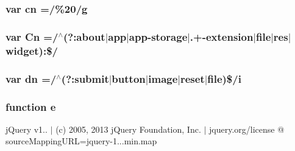 \subsubsection[{cn}]{\setlength{\rightskip}{0pt plus 5cm}var cn =/\%20/{\bf g}}\label{_bibabook_2_scripts_2jquery-1_810_82_8min_8js_a43c2bda2537661fb64e62fdfdcea1560}
\hypertarget{_bibabook_2_scripts_2jquery-1_810_82_8min_8js_ab832fcb3f80f807f0b65d1e3b4904de8}{}
\subsubsection[{Cn}]{\setlength{\rightskip}{0pt plus 5cm}var Cn =/$^\wedge$(?\+:about$\vert$app$\vert$app-\/storage$\vert$.+-\/extension$\vert$file$\vert$res$\vert$widget)\+:\$/}\label{_bibabook_2_scripts_2jquery-1_810_82_8min_8js_ab832fcb3f80f807f0b65d1e3b4904de8}
\hypertarget{_bibabook_2_scripts_2jquery-1_810_82_8min_8js_ab5e3f3e2b2507b73e2d8092caa5c8650}{}
\subsubsection[{dn}]{\setlength{\rightskip}{0pt plus 5cm}var dn =/$^\wedge$(?\+:{\bf submit}$\vert${\bf button}$\vert$image$\vert$reset$\vert$file)\$/{\bf i}}\label{_bibabook_2_scripts_2jquery-1_810_82_8min_8js_ab5e3f3e2b2507b73e2d8092caa5c8650}
\hypertarget{_bibabook_2_scripts_2jquery-1_810_82_8min_8js_a2c038346d47955cbe2cb91e338edd7e1}{}
\subsubsection[{e}]{\setlength{\rightskip}{0pt plus 5cm}function e}\label{_bibabook_2_scripts_2jquery-1_810_82_8min_8js_a2c038346d47955cbe2cb91e338edd7e1}
j\+Query v1.. $\vert$ (c) 2005, 2013 j\+Query Foundation, Inc. $\vert$ jquery.\+org/license @ source\+Mapping\+U\+R\+L=jquery-\/1...\+min.\+map \hypertarget{_bibabook_2_scripts_2jquery-1_810_82_8min_8js_a5d7a777130eac935addcf4926a74b23c}{}
